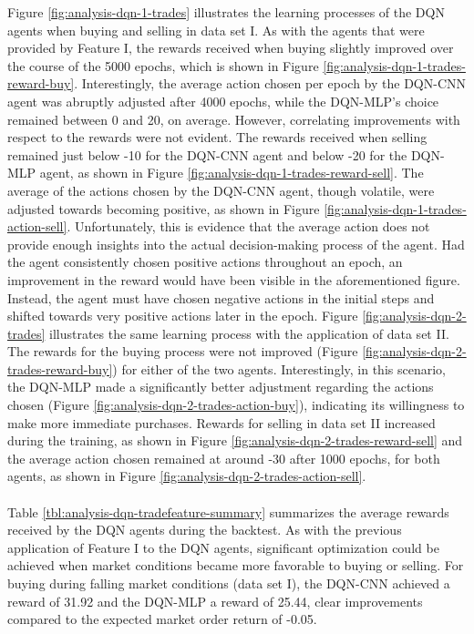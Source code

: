 Figure \ref{fig:analysis-dqn-1-trades} illustrates the learning processes of the DQN agents when buying and selling in data set I.
As with the agents that were provided by Feature I, the rewards received when buying slightly improved over the course of the 5000 epochs, which is shown in Figure \ref{fig:analysis-dqn-1-trades-reward-buy}.
Interestingly, the average action chosen per epoch by the DQN-CNN agent was abruptly adjusted after 4000 epochs, while the DQN-MLP's choice remained between 0 and 20, on average.
However, correlating improvements with respect to the rewards were not evident.
The rewards received when selling remained just below -10 for the DQN-CNN agent and below -20 for the DQN-MLP agent, as shown in Figure \ref{fig:analysis-dqn-1-trades-reward-sell}.
The average of the actions chosen by the DQN-CNN agent, though volatile, were adjusted towards becoming positive, as shown in Figure \ref{fig:analysis-dqn-1-trades-action-sell}.
Unfortunately, this is evidence that the average action does not provide enough insights into the actual decision-making process of the agent.
Had the agent consistently chosen positive actions throughout an epoch, an improvement in the reward would have been visible in the aforementioned figure.
Instead, the agent must have chosen negative actions in the initial steps and shifted towards very positive actions later in the epoch.
Figure \ref{fig:analysis-dqn-2-trades} illustrates the same learning process with the application of data set II.
The rewards for the buying process were not improved (Figure \ref{fig:analysis-dqn-2-trades-reward-buy}) for either of the two agents.
Interestingly, in this scenario, the DQN-MLP made a significantly better adjustment regarding the actions chosen (Figure \ref{fig:analysis-dqn-2-trades-action-buy}), indicating its willingness to make more immediate purchases.
Rewards for selling in data set II increased during the training, as shown in Figure \ref{fig:analysis-dqn-2-trades-reward-sell} and the average action chosen remained at around -30 after 1000 epochs, for both agents, as shown in Figure \ref{fig:analysis-dqn-2-trades-action-sell}.
\\
\\
Table \ref{tbl:analysis-dqn-tradefeature-summary} summarizes the average rewards received by the DQN agents during the backtest.
As with the previous application of Feature I to the DQN agents, significant optimization could be achieved when market conditions became more favorable to buying or selling.
For buying during falling market conditions (data set I), the DQN-CNN achieved a reward of 31.92 and the DQN-MLP a reward of 25.44, clear improvements compared to the expected market order return of -0.05.
